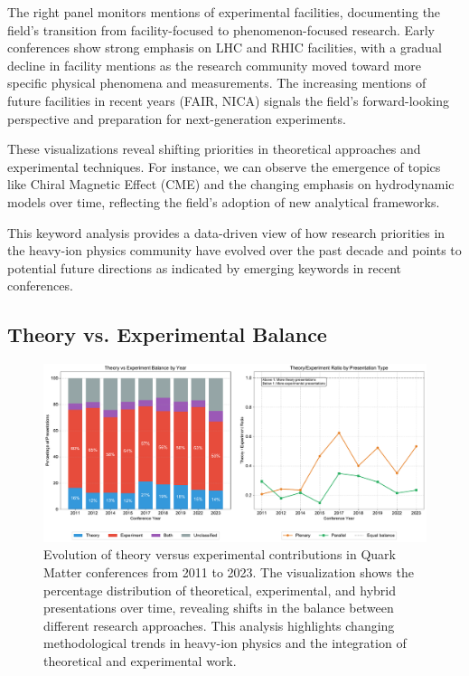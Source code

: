 \documentclass[a4paper,11pt]{article}
\begin{document}
The right panel monitors mentions of experimental facilities, documenting the field's transition from facility-focused to phenomenon-focused research. Early conferences show strong emphasis on LHC and RHIC facilities, with a gradual decline in facility mentions as the research community moved toward more specific physical phenomena and measurements. The increasing mentions of future facilities in recent years (FAIR, NICA) signals the field's forward-looking perspective and preparation for next-generation experiments.

These visualizations reveal shifting priorities in theoretical approaches and experimental techniques. For instance, we can observe the emergence of topics like Chiral Magnetic Effect (CME) and the changing emphasis on hydrodynamic models over time, reflecting the field's adoption of new analytical frameworks.

This keyword analysis provides a data-driven view of how research priorities in the heavy-ion physics community have evolved over the past decade and points to potential future directions as indicated by emerging keywords in recent conferences.

\subsection{Theory vs. Experimental Balance}

\begin{figure}[H]
\centering
\includegraphics[width=\textwidth]{figures/theory_experiment_balance.pdf}
\caption{Evolution of theory versus experimental contributions in Quark Matter conferences from 2011 to 2023. The visualization shows the percentage distribution of theoretical, experimental, and hybrid presentations over time, revealing shifts in the balance between different research approaches. This analysis highlights changing methodological trends in heavy-ion physics and the integration of theoretical and experimental work.}
\label{fig:theory_experiment}
\end{figure}
\end{document}
